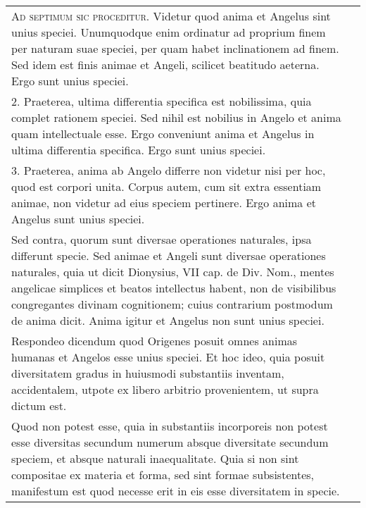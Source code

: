 \documentclass[10pt]{jsarticle} %
\begin{document}
\begin{longtable}{p{21em}p{21em}}

{\scshape Ad septimum sic proceditur}. Videtur quod anima et Angelus
 sint unius speciei. Unumquodque enim ordinatur ad proprium finem per
 naturam suae speciei, per quam habet inclinationem ad finem. Sed idem
 est finis animae et Angeli, scilicet beatitudo aeterna. Ergo sunt
 unius speciei.



&

\\



2. Praeterea, ultima differentia specifica est nobilissima, quia complet rationem speciei. Sed nihil est nobilius in Angelo et anima quam intellectuale esse. Ergo conveniunt anima et Angelus in ultima differentia specifica. Ergo sunt unius speciei.


&

\\



3. Praeterea, anima ab Angelo differre non videtur nisi per hoc, quod est corpori unita. Corpus autem, cum sit extra essentiam animae, non videtur ad eius speciem pertinere. Ergo anima et Angelus sunt unius speciei.


&

\\



Sed contra, quorum sunt diversae operationes naturales, ipsa differunt specie. Sed animae et Angeli sunt diversae operationes naturales, quia ut dicit Dionysius, VII cap. de Div. Nom., mentes angelicae simplices et beatos intellectus habent, non de visibilibus congregantes divinam cognitionem; cuius contrarium postmodum de anima dicit. Anima igitur et Angelus non sunt unius speciei.

&

\\



Respondeo dicendum quod Origenes posuit omnes animas humanas et
 Angelos esse unius speciei. Et hoc ideo, quia posuit diversitatem
 gradus in huiusmodi substantiis inventam, accidentalem, utpote ex
 libero arbitrio provenientem, ut supra dictum est. 

&

\\


Quod non potest esse, quia in substantiis incorporeis non potest esse
 diversitas secundum numerum absque diversitate secundum speciem, et
 absque naturali inaequalitate. Quia si non sint compositae ex materia
 et forma, sed sint formae subsistentes, manifestum est quod necesse
 erit in eis esse diversitatem in specie. 



\end{longtable}
\end{document}
